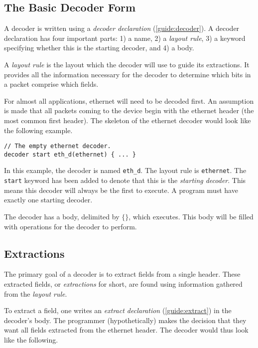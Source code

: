 \subsection{The Basic Decoder Form} \label{tut:basic_decoder}

A decoder is written using a \textit{decoder declaration} (\ref{guide:decoder}).
A decoder declaration has four important parts: 1) a name, 2) a \textit{layout
rule}, 3) a keyword specifying whether this is the starting decoder, and 4) a
body.

A \textit{layout rule} is the layout which the decoder
will use to guide its extractions. It provides all the information necessary for
the decoder to determine which bits in a packet comprise which fields.

For almost all applications, ethernet will need to be decoded first. An assumption is made that all packets coming to the device begin with the
ethernet header (the most common first header). The skeleton of the ethernet decoder would look like the following example.

\begin{codepage}
\begin{lstlisting}
// The empty ethernet decoder.
decoder start eth_d(ethernet) { ... }
\end{lstlisting}
\end{codepage}

In this example, the decoder is named \texttt{eth\_d}. The layout rule is
\texttt{ethernet}. The \texttt{start} keyword has been added to denote that this is the \textit{starting decoder}. This means this
decoder will always be the first to execute. A program must have exactly one
starting decoder. 

The decoder has a body, delimited by $\lbrace\rbrace$, which executes. This body will be filled with operations for the decoder to perform.

\subsection{Extractions} \label{tut:decoder_extract}

The primary goal of a decoder is to extract fields from a single header. These
extracted fields, or \textit{extractions} for short, are found using information
gathered from the \textit{layout rule}.

To extract a field, one writes an \textit{extract declaration}
(\ref{guide:extract}) in the decoder's body. The programmer (hypothetically) makes the decision that they want all fields
extracted from the ethernet header. The decoder would thus look like the following.

